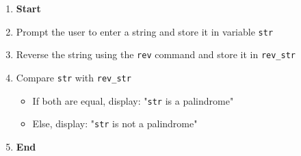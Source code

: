 \begin{enumerate}
    \item \textbf{Start}
    \item Prompt the user to enter a string and store it in variable \texttt{str}
    \item Reverse the string using the \texttt{rev} command and store it in \texttt{rev\_str}
    \item Compare \texttt{str} with \texttt{rev\_str}
    \begin{itemize}
        \item If both are equal, display: "\texttt{str} is a palindrome"
        \item Else, display: "\texttt{str} is not a palindrome"
    \end{itemize}
    \item \textbf{End}
\end{enumerate}

